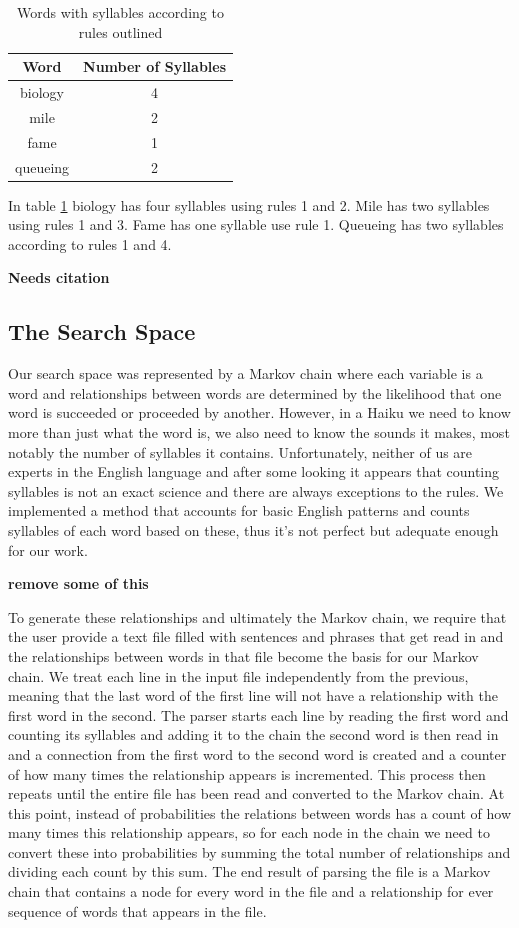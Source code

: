\documentclass[]{article}
\newcommand{\comment}[1]
{\par {\bfseries \color{green} #1 \par}}
\begin{document}
\begin{table}[H]
\begin{center}
	\begin{tabular}{| c | c |}
		\hline
		Word & Number of Syllables \\
		\hline
		biology & 4 \\
		\hline
		mile & 2 \\
		\hline
		fame & 1 \\
		\hline
		queueing & 2 \\
		\hline
	\end{tabular}
\caption{Words with syllables according to rules outlined}
\label{table:syllables}
\end{center}
\end{table}

In table \ref{table:syllables} biology has four syllables using rules 1 and 2. Mile has two syllables using rules 1 and 3. Fame has one syllable use rule 1. Queueing has two syllables according to rules 1 and 4. \comment{Needs citation}
\subsection{The Search Space}
Our search space was represented by a Markov chain where each variable is a word and relationships between words are determined by the likelihood that one word is succeeded or proceeded by another. However, in a Haiku we need to know more than just what the word is, we also need to know the sounds it makes, most notably the number of syllables it contains. Unfortunately, neither of us are experts in the English language and after some looking it appears that counting syllables is not an exact science and there are always exceptions to the rules. We implemented a method that accounts for basic English patterns and counts syllables of each word based on these, thus it's not perfect but adequate enough for our work.\comment{remove some of this}

To generate these relationships and ultimately the Markov chain, we require that the user provide a text file filled with sentences and phrases that get read in and the relationships between words in that file become the basis for our Markov chain. We treat each line in the input file independently from the previous, meaning that the last word of the first line will not have a relationship with the first word in the second. The parser starts each line by reading the first word and counting its syllables and adding it to the chain the second word is then read in and a connection from the first word to the second word is created and a counter of how many times the relationship appears is incremented. This process then repeats until the entire file has been read and converted to the Markov chain. At this point, instead of probabilities the relations between words has a count of how many times this relationship appears, so for each node in the chain we need to convert these into probabilities by summing the total number of relationships and dividing each count by this sum. The end result of parsing the file is a Markov chain that contains a node for every word in the file and a relationship for ever sequence of words that appears in the file.
\end{document}
